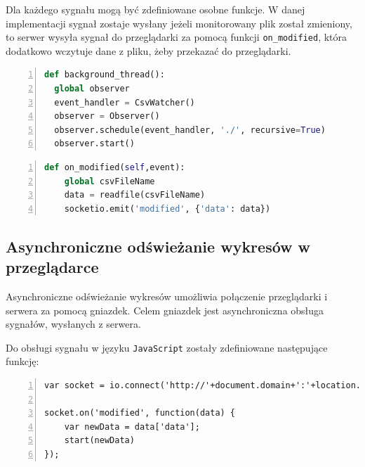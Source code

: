 \documentclass[a4paper]{article}
\begin{document}
    Dla każdego sygnału mogą być zdefiniowane osobne funkcje. 
    W danej implementacji sygnał zostaje wysłany 
    jeżeli monitorowany plik został zmieniony, to serwer wysyła sygnał
    do przeglądarki za pomocą funkcji \texttt{on\_modified}, która dodatkowo
    wczytuje dane z pliku, żeby przekazać do przeglądarki.
   \begin{lstlisting}[frame=single, numbers=left, basicstyle=\ttfamily\small, language=python,
    caption={Definicja wątku, monitorującego zmiany w plikach o zadanych rozszerzeniu}]
def background_thread():
  global observer
  event_handler = CsvWatcher()
  observer = Observer()
  observer.schedule(event_handler, './', recursive=True)
  observer.start()
   \end{lstlisting}

\begin{lstlisting}[frame=single, numbers=left, basicstyle=\ttfamily\small, language=python,
    caption={Definicja funkcji wysyłającej sygnał i dane}]
def on_modified(self,event):
    global csvFileName
    data = readfile(csvFileName)
    socketio.emit('modified', {'data': data})
   \end{lstlisting}

    \subsection{Asynchroniczne odświeżanie wykresów w przeglądarce}
    Asynchroniczne odświeżanie wykresów umożliwia połączenie przeglądarki i serwera za pomocą gniazdek.
    Celem gniazdek jest asynchroniczna obsługa sygnałów, wysłanych z serwera.
    
    Do obsługi sygnału w języku \texttt{JavaScript} zostały zdefiniowane następujące funkcję:
\begin{lstlisting}[frame=single, numbers=left, basicstyle=\ttfamily\small,
    caption={Połączenie gniazdek w przeglądrce z serwerem i odebranie danych}]
var socket = io.connect('http://'+document.domain+':'+location.port);

socket.on('modified', function(data) {
    var newData = data['data'];
    start(newData)
});

\end{lstlisting}





\end{document}
